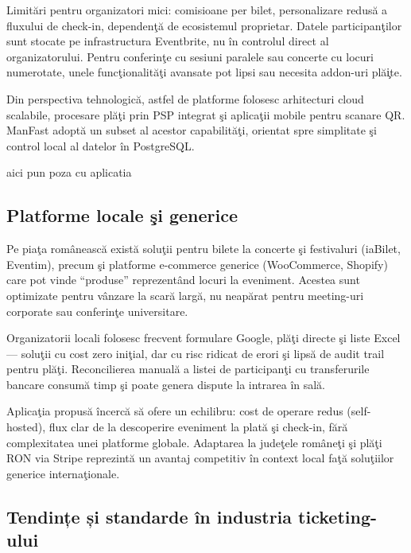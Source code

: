 Limit\u ari pentru organizatori mici: comisioane per bilet, personalizare redus\u a a fluxului de check-in, dependen\c t\u a de ecosistemul proprietar. Datele participan\c tilor sunt stocate pe infrastructura Eventbrite, nu \^in controlul direct al organizatorului. Pentru conferin\c te cu sesiuni paralele sau concerte cu locuri numerotate, unele func\c tionalit\u a\c ti avansate pot lipsi sau necesita addon-uri pl\u a\c ite.

Din perspectiva tehnologic\u a, astfel de platforme folosesc arhitecturi cloud scalabile, procesare pl\u a\c ti prin PSP integrat \c si aplica\c tii mobile pentru scanare QR. ManFast adopt\u a un subset al acestor capabilit\u a\c ti, orientat spre simplitate \c si control local al datelor \^in PostgreSQL.

aici pun poza cu aplicatia 


\subsection{Platforme locale \c si generice}

Pe pia\c ta rom\^aneasc\u a exist\u a solu\c tii pentru bilete la concerte \c si festivaluri (iaBilet, Eventim), precum \c si platforme e-commerce generice (WooCommerce, Shopify) care pot vinde ``produse'' reprezent\^and locuri la eveniment. Acestea sunt optimizate pentru v\^anzare la scar\u a larg\u a, nu neap\u arat pentru meeting-uri corporate sau conferin\c te universitare.

Organizatorii locali folosesc frecvent formulare Google, pl\u a\c ti directe \c si liste Excel --- solu\c tii cu cost zero ini\c tial, dar cu risc ridicat de erori \c si lips\u a de audit trail pentru pl\u a\c ti. Reconcilierea manual\u a a listei de participan\c ti cu transferurile bancare consum\u a timp \c si poate genera dispute la intrarea \^in sal\u a.

Aplica\c tia propus\u a \^incerc\u a s\u a ofere un echilibru: cost de operare redus (self-hosted), flux clar de la descoperire eveniment la plat\u a \c si check-in, f\u ar\u a complexitatea unei platforme globale. Adaptarea la jude\c tele rom\^ane\c ti \c si pl\u a\c ti RON via Stripe reprezint\u a un avantaj competitiv \^in context local fa\c t\u a solu\c tiilor generice interna\c tionale.

\subsection{Tendințe și standarde în industria ticketing-ului}

